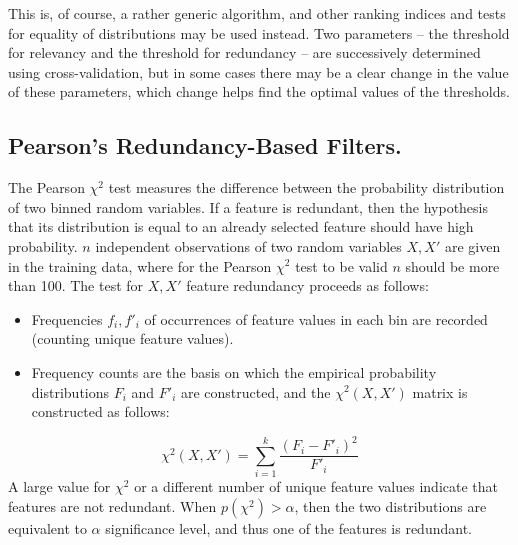 \documentclass[a4paper,fleqn]{report}
\newcommand\be{\vspace*{1pt}\begin{equation}}
\newcommand\ee{\end{equation}\vspace*{1pt}}
\begin{document}
This is, of course, a rather generic algorithm, and other ranking indices and tests for equality of distributions may be used instead.
Two parameters -- the threshold for relevancy and the threshold for redundancy -- are successively determined using cross-validation,
but in some cases there may be a clear change in the value of these parameters, which change helps find the optimal values of the thresholds.

\subsection{Pearson's Redundancy-Based Filters.}

The Pearson $\chi^2$ test measures the difference between the probability distribution of two binned random variables. 
If a feature is redundant, then the hypothesis that its distribution is equal to an already selected feature should have high probability.  
$n$ independent observations of two random variables $X, X'$ are given in the training data, where for the Pearson $\chi^2$ test to be valid $n$ should be more than 100. The test for $X, X'$ feature redundancy proceeds as follows:

\begin{itemize}
\item Frequencies $f_i, f'_i$ of occurrences of feature values in each bin are recorded (counting unique feature values).
\item Frequency counts are the basis on which the empirical probability distributions $F_i$ and $F'_i$ are constructed, and the  $\chi^2(X,X')$ matrix is constructed as follows: 
\end{itemize}
%
\be 
\chi^2(X,X') = \sum_{i=1}^{k} \frac{\left(F_i - F'_i\right)^2}{F'_i}
\ee
%
A large value for $\chi^2$ or a different number of unique feature values indicate that features are not redundant.
When $ p(\chi^2) > \alpha $, then the two distributions are equivalent to $\alpha$ significance level, and thus 
one of the features is redundant. 
\end{document}
